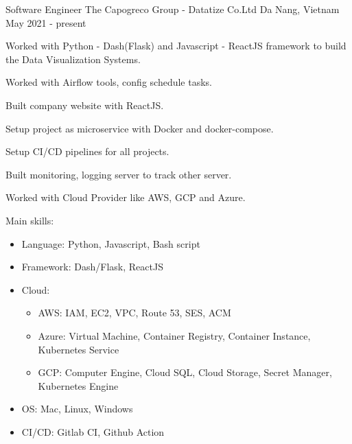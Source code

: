 

\begin{cventries}

  \cventry
    {Software Engineer} %
    {The Capogreco Group - Datatize Co.Ltd} %
    {Da Nang, Vietnam} %
    {May 2021 - present} %
    {
      \begin{cvitems} %
        \item {Worked with Python - Dash(Flask) and Javascript - ReactJS framework to build the Data Visualization Systems.}
        \item {Worked with Airflow tools, config schedule tasks.}
        \item {Built company website with ReactJS.}
        \item {Setup project as microservice with Docker and docker-compose.}
        \item {Setup CI/CD pipelines for all projects.}
        \item {Built monitoring, logging server to track other server.}
        \item {Worked with Cloud Provider like AWS, GCP and Azure.}
        \item {Main skills:
        	\begin{itemize}
            \item {Language: Python, Javascript, Bash script}
            \item {Framework: Dash/Flask, ReactJS}
            \item {Cloud:}
            	\begin{itemize}
                \item {AWS: IAM, EC2, VPC, Route 53, SES, ACM}
                \item {Azure: Virtual Machine, Container Registry, Container Instance, Kubernetes Service}
                \item {GCP: Computer Engine, Cloud SQL, Cloud Storage, Secret Manager, Kubernetes Engine }
			        \end{itemize}
        \item {OS: Mac, Linux, Windows}
        \item {CI/CD: Gitlab CI, Github Action}
			\end{itemize}
        }
      \end{cvitems}
    }


\end{cventries}
